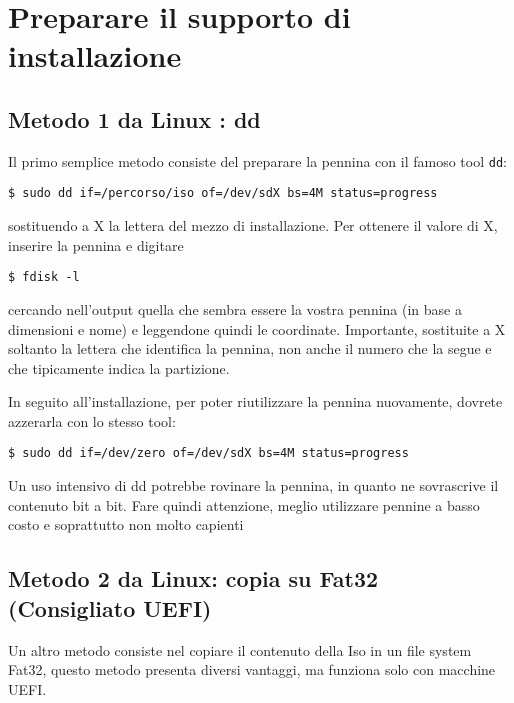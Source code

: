 \documentclass[twoside,italian]{book}
\newcommand{\code}[1]{\texttt{#1}}
\begin{document}
    
	\cleardoublepage

	\tableofcontents

\chapter {Preparare il supporto di installazione}

\section{Metodo 1 da Linux : dd}

    Il primo semplice metodo consiste del preparare la pennina con il famoso tool \code{dd}:
    \begin{lstlisting}
$ sudo dd if=/percorso/iso of=/dev/sdX bs=4M status=progress
    \end{lstlisting}
    sostituendo a X la lettera del mezzo di installazione. Per ottenere il valore di X, inserire la pennina e digitare 
    \begin{lstlisting}
$ fdisk -l
    \end{lstlisting}
    cercando nell'output quella che sembra essere la vostra pennina (in base a dimensioni e nome) e leggendone quindi le coordinate. 
    Importante, sostituite a X soltanto la lettera che identifica la pennina, non anche il numero che la segue e che tipicamente indica la partizione.

    In seguito all'installazione, per poter riutilizzare la pennina nuovamente, dovrete azzerarla con lo stesso tool:
    \begin{lstlisting}
$ sudo dd if=/dev/zero of=/dev/sdX bs=4M status=progress
    \end{lstlisting}
    
    \begin{tcolorbox}[floatplacement=b,width=\textwidth,title={NOTA BENE:}, colback={lightgray},colbacktitle=gray,coltitle=white,colupper=black]
        Un uso intensivo di dd potrebbe rovinare la pennina, in quanto ne sovrascrive il contenuto bit a bit. Fare quindi attenzione, meglio utilizzare pennine a basso costo e soprattutto non molto capienti
    \end{tcolorbox}

\section{Metodo 2  da Linux:  copia su Fat32 (Consigliato UEFI)}
    Un altro metodo consiste nel copiare il contenuto della Iso in un file system Fat32, questo metodo presenta diversi vantaggi, ma funziona solo con macchine \ac{UEFI}.
\end{document}
